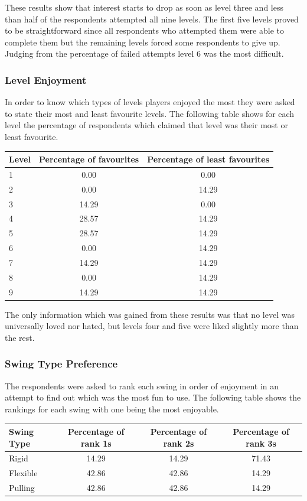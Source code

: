 \documentclass[]{report}
\begin{document}
			These results show that interest starts to drop as soon as level three and less than half of the respondents attempted all nine levels. The first five levels proved to be straightforward since all respondents who attempted them were able to complete them but the remaining levels forced some respondents to give up. Judging from the percentage of failed attempts level 6 was the most difficult.
				
			\subsubsection{Level Enjoyment}
			In order to know which types of levels players enjoyed the most they were asked to state their most and least favourite levels. The following table shows for each level the percentage of respondents which claimed that level was their most or least favourite.
			
			\begin{tabular}[H]{ l || c | c }
				Level & Percentage of favourites & Percentage of least favourites \\
				\hline
		        1 & 0.00 & 0.00 \\
		        2 & 0.00 & 14.29 \\
		        3 & 14.29 & 0.00 \\
		        4 & 28.57 & 14.29 \\
		        5 & 28.57 & 14.29 \\
		        6 & 0.00 & 14.29 \\
		        7 & 14.29 & 14.29 \\
		        8 & 0.00 & 14.29 \\
		        9 & 14.29 & 14.29 \\
			\end{tabular}
			
			The only information which was gained from these results was that no level was universally loved nor hated, but levels four and five were liked slightly more than the rest.
			
			\subsubsection{Swing Type Preference}
			The respondents were asked to rank each swing in order of enjoyment in an attempt to find out which was the most fun to use. The following table shows the rankings for each swing with one being the most enjoyable.
			
			\begin{tabular}[H]{ l || c | c | c }
				Swing Type & Percentage of rank 1s & Percentage of rank 2s& Percentage of rank 3s \\
				\hline
		        Rigid & 14.29 & 14.29 & 71.43 \\
		        Flexible & 42.86 & 42.86 & 14.29 \\
		        Pulling & 42.86 & 42.86 & 14.29 \\
			\end{tabular}
			
\end{document}
